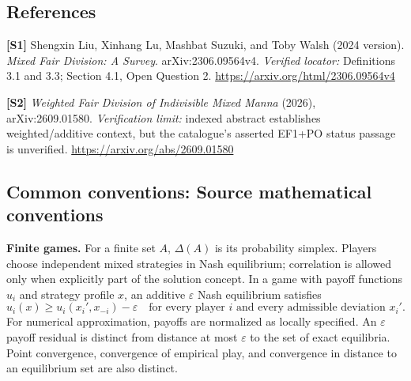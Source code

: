\documentclass[11pt,a4paper]{article}
\begin{document}
\subsection*{References}
\begingroup\footnotesize\raggedright
\textbf{[S1]} Shengxin Liu, Xinhang Lu, Mashbat Suzuki, and Toby Walsh (2024 version). \emph{Mixed Fair Division: A Survey}. arXiv:2306.09564v4. \textit{Verified locator:} Definitions 3.1 and 3.3; Section 4.1, Open Question 2. \url{https://arxiv.org/html/2306.09564v4}
\par\textbf{[S2]} \emph{Weighted Fair Division of Indivisible Mixed Manna} (2026), arXiv:2609.01580. \textit{Verification limit:} indexed abstract establishes weighted/additive context, but the catalogue's asserted EF1+PO status passage is unverified. \url{https://arxiv.org/abs/2609.01580}



\par\endgroup

\subsection*{Common conventions: Source mathematical conventions}

\textbf{Finite games.} For a finite set $A$, $\Delta(A)$ is its probability
simplex. Players choose independent mixed strategies in Nash equilibrium;
correlation is allowed only when explicitly part of the solution concept.
In a game with payoff functions $u_i$ and strategy profile $x$, an additive
$\varepsilon$ Nash equilibrium satisfies
\[
 u_i(x)\geq u_i(x_i',x_{-i})-\varepsilon
 \quad\text{for every player $i$ and every admissible deviation $x_i'$}.
\]
For numerical approximation, payoffs are normalized as locally specified.
An $\varepsilon$ payoff residual is distinct from distance at most
$\varepsilon$ to the set of exact equilibria. Point convergence, convergence
of empirical play, and convergence in distance to an equilibrium set are
also distinct.
\end{document}
